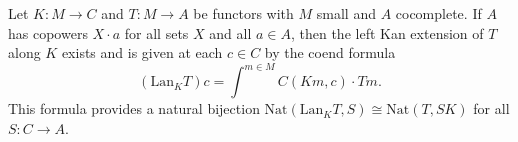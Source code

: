 Let $K: M \to C$ and $T: M \to A$ be functors with $M$ small and $A$ cocomplete. If $A$ has copowers $X \cdot a$ for all sets $X$ and all $a \in A$, then the left Kan extension of $T$ along $K$ exists and is given at each $c \in C$ by the coend formula
$$(\mathrm{Lan}_K T)c = \int^{m \in M} C(Km, c) \cdot Tm.$$
This formula provides a natural bijection $\mathrm{Nat}(\mathrm{Lan}_K T, S) \cong \mathrm{Nat}(T, SK)$ for all $S: C \to A$.
